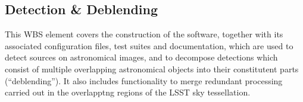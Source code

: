 \subsection{Detection \& Deblending}

This WBS element covers the construction of the software, together with its
associated configuration files, test suites and documentation, which are used
to detect sources on astronomical images, and to decompose detections which
consist of multiple overlapping astronomical objects into their constitutent
parts (``deblending''). It also includes functionality to merge redundant
processing carried out in the overlapptng regions of the LSST sky
tessellation.
